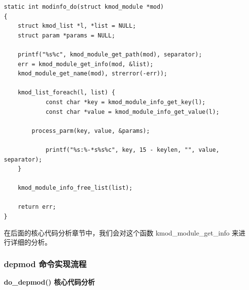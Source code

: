\documentclass[11pt,a4paper]{article}
\begin{document}
{\begin{shaded}\begin{verbatim}
static int modinfo_do(struct kmod_module *mod)
{
    struct kmod_list *l, *list = NULL;
    struct param *params = NULL;

    printf("%s%c", kmod_module_get_path(mod), separator);
    err = kmod_module_get_info(mod, &list);
    kmod_module_get_name(mod), strerror(-err));

    kmod_list_foreach(l, list) {
            const char *key = kmod_module_info_get_key(l);
            const char *value = kmod_module_info_get_value(l);

        process_parm(key, value, &params);

            printf("%s:%-*s%s%c", key, 15 - keylen, "", value, separator);
    }

    kmod_module_info_free_list(list);

    return err;
}
\end{verbatim}\end{shaded}}
在后面的核心代码分析章节中，我们会对这个函数 kmod\_module\_get\_info
来进行详细的分析。

\subsubsection{depmod 命令实现流程}

\textbf{do\_depmod() 核心代码分析}
\end{document}
